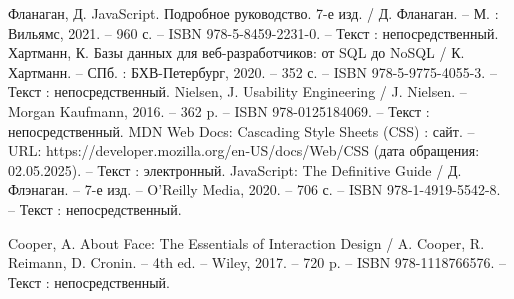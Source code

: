 \begin{thebibliography}{21}
 	 Фланаган, Д. JavaScript. Подробное руководство. 7-е изд. / Д. Фланаган. – М. : Вильямс, 2021. – 960 с. – ISBN 978-5-8459-2231-0. – Текст : непосредственный.
		Хартманн, К. Базы данных для веб-разработчиков: от SQL до NoSQL / К. Хартманн. – СПб. : БХВ-Петербург, 2020. – 352 с. – ISBN 978-5-9775-4055-3. – Текст : непосредственный. 
	 Nielsen, J. Usability Engineering / J. Nielsen. – Morgan Kaufmann, 2016. – 362 p. – ISBN 978-0125184069. – Текст : непосредственный.
	 MDN Web Docs: Cascading Style Sheets (CSS) : сайт. – URL: https://developer.mozilla.org/en-US/docs/Web/CSS (дата обращения: 02.05.2025). – Текст : электронный.
	 JavaScript: The Definitive Guide / Д. Флэнаган. – 7-е изд. – O’Reilly Media, 2020. – 706 с. – ISBN 978-1-4919-5542-8. – Текст : непосредственный.
	
	 Cooper, A. About Face: The Essentials of Interaction Design / A. Cooper, R. Reimann, D. Cronin. – 4th ed. – Wiley, 2017. – 720 p. – ISBN 978-1118766576. – Текст : непосредственный.

\end{thebibliography}
